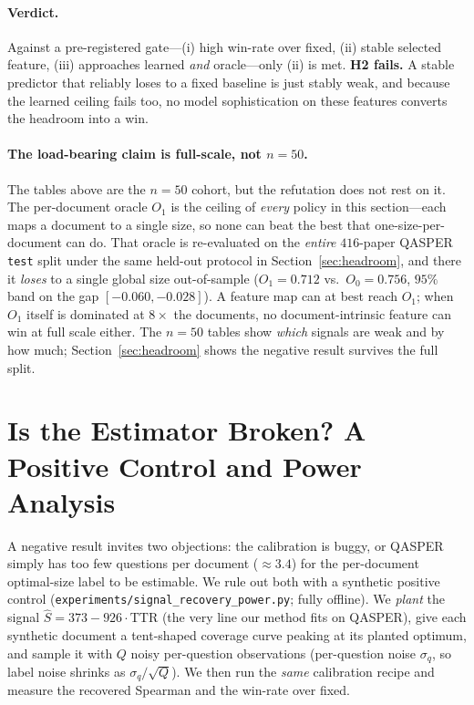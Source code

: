 \documentclass[11pt]{article}
\begin{document}
\paragraph{Verdict.} Against a pre-registered gate---(i) high win-rate over fixed,
(ii) stable selected feature, (iii) approaches learned \emph{and} oracle---only
(ii) is met. \textbf{H2 fails.} A stable predictor that reliably loses to a fixed
baseline is just stably weak, and because the learned ceiling fails too, no model
sophistication on these features converts the headroom into a win.

\paragraph{The load-bearing claim is full-scale, not $n{=}50$.} The tables above are
the $n{=}50$ cohort, but the refutation does not rest on it. The per-document oracle
$O_1$ is the ceiling of \emph{every} policy in this section---each maps a document to
a single size, so none can beat the best that one-size-per-document can do. That
oracle is re-evaluated on the \emph{entire} $416$-paper QASPER \texttt{test} split
under the same held-out protocol in Section~\ref{sec:headroom}, and there it
\emph{loses} to a single global size out-of-sample ($O_1{=}0.712$ vs.\ $O_0{=}0.756$,
$95\%$ band on the gap $[-0.060,-0.028]$). A feature map can at best reach $O_1$; when
$O_1$ itself is dominated at $8\times$ the documents, no document-intrinsic feature can
win at full scale either. The $n{=}50$ tables show \emph{which} signals are weak and by
how much; Section~\ref{sec:headroom} shows the negative result survives the full split.

\section{Is the Estimator Broken? A Positive Control and Power Analysis}
\label{sec:power}

A negative result invites two objections: the calibration is buggy, or QASPER
simply has too few questions per document ($\approx 3.4$) for the per-document
optimal-size label to be estimable. We rule out both with a synthetic positive
control (\texttt{experiments/signal\_recovery\_power.py}; fully offline). We
\emph{plant} the signal $\hat S = 373 - 926\cdot\text{TTR}$ (the very line our
method fits on QASPER), give each synthetic document a tent-shaped coverage curve
peaking at its planted optimum, and sample it with $Q$ noisy per-question
observations (per-question noise $\sigma_q$, so label noise shrinks as
$\sigma_q/\sqrt{Q}$). We then run the \emph{same} calibration recipe and measure
the recovered Spearman and the win-rate over fixed.
\end{document}
